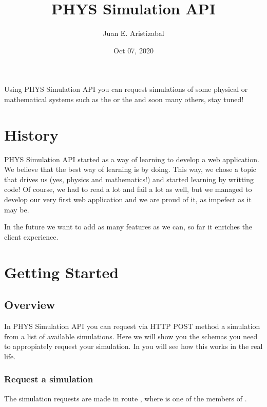 \documentclass[a4paper,landscape,10pt,english]{sphinxmanual}
\title{PHYS Simulation API}
\date{Oct 07, 2020}
\author{Juan E.\@{} Aristizabal}
\begin{document}
\pagestyle{empty}
\sphinxmaketitle
\pagestyle{plain}
\sphinxtableofcontents
\pagestyle{normal}
\label{\detokenize{index::doc}}


Using PHYS Simulation API you can request simulations of some physical or
mathematical systems such as the  or the
 \textendash{}and soon many others, stay tuned!


\chapter{History}
\label{\detokenize{index:history}}
PHYS Simulation API started as a way of learning to develop a web application.
We believe that the best way of learning is by doing. This way, we chose
a topic that drives us (yes, physics and mathematics!) and started learning by
writting code! Of course, we had to read a lot and fail a lot as well, but
we managed to develop our very first web application and we are proud of it, as
impefect as it may be.

In the future we want to add as many features as we can, so far it enriches
the client experience.


\chapter{Getting Started}
\label{\detokenize{index:getting-started}}

\section{Overview}
\label{\detokenize{start/overview:overview}}\label{\detokenize{start/overview:start-overview}}\label{\detokenize{start/overview::doc}}
In PHYS Simulation API you can request \textendash{}via HTTP POST method\textendash{} a simulation from
a list of available simulations. Here we will show you the schemas you need to
appropiately request your simulation. In {\hyperref[\detokenize{start/examples:start-examples}]{}} you
will see how this works in the real life.


\subsection{Request a simulation}
\label{\detokenize{start/overview:request-a-simulation}}
The simulation requests are made in route ,
where  is one of the members of
{\hyperref[\detokenize{code_docs/simulation_API.controller:simulation_API.controller.schemas.SimSystem}]{}}.
\end{document}
